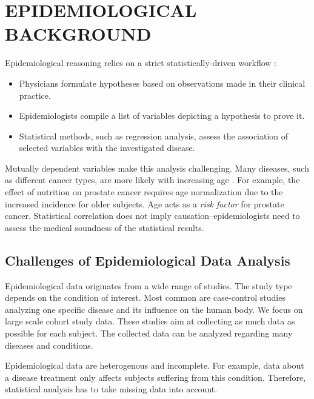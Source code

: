 \documentclass[a4paper,twoside]{style/article}
\begin{document}
\section{\uppercase{Epidemiological Background}}
\label{sec:EpidemiologicalBackground}
\noindent Epidemiological reasoning relies on a strict statistically-driven workflow \cite{Fletcher}:
\begin{itemize}
	\item Physicians formulate hypotheses based on observations made in their clinical practice.
	\item Epidemiologists compile a list of variables depicting a hypothesis to prove it.
	\item Statistical methods, such as regression analysis, assess the association of selected variables with the investigated disease.
\end{itemize}
Mutually dependent variables make this analysis challenging.
Many diseases, such as different cancer types, are more likely with increasing age \cite{Fletcher}.
For example, the effect of nutrition on prostate cancer requires age normalization due to the increased incidence for older subjects.
Age acts as a \emph{risk factor} for prostate cancer.
Statistical correlation does not imply causation--epidemiologists need to assess the medical soundness of the statistical results.
\subsection{Challenges of Epidemiological Data Analysis}
Epidemiological data originates from a wide range of studies.
The study type depends on the condition of interest.
Most common are case-control studies analyzing one specific disease and its influence on the human body.
We focus on large scale cohort study data.
These studies aim at collecting as much data as possible for each subject.
The collected data can be analyzed regarding many diseases and conditions.

Epidemiological data are heterogenous and incomplete.
For example, data about a disease treatment only affects subjects suffering from this condition.
Therefore, statistical analysis has to take missing data into account.
\end{document}
